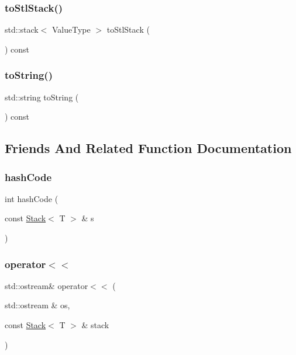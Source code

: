 \subsubsection{\texorpdfstring{to\+Stl\+Stack()}{toStlStack()}}
{\footnotesize\ttfamily std\+::stack$<$ Value\+Type $>$ to\+Stl\+Stack (\begin{DoxyParamCaption}{ }\end{DoxyParamCaption}) const}

\mbox{\label{classStack_a1fe5121d6528fdea3f243321b3fa3a49}} 
\subsubsection{\texorpdfstring{to\+String()}{toString()}}
{\footnotesize\ttfamily std\+::string to\+String (\begin{DoxyParamCaption}{ }\end{DoxyParamCaption}) const}



\subsection{Friends And Related Function Documentation}
\mbox{\label{classStack_add24e0ce849c0b2045c24ee3fba490ea}} 
\subsubsection{\texorpdfstring{hash\+Code}{hashCode}}
{\footnotesize\ttfamily int hash\+Code (\begin{DoxyParamCaption}\item[{const \mbox{\hyperlink{classStack}{Stack}}$<$ T $>$ \&}]{s }\end{DoxyParamCaption})\hspace{0.3cm}{\ttfamily [friend]}}

\mbox{\label{classStack_a047eaf65350ba824d7aa36c925289d9c}} 
\subsubsection{\texorpdfstring{operator$<$$<$}{operator<<}}
{\footnotesize\ttfamily std\+::ostream\& operator$<$$<$ (\begin{DoxyParamCaption}\item[{std\+::ostream \&}]{os,  }\item[{const \mbox{\hyperlink{classStack}{Stack}}$<$ T $>$ \&}]{stack }\end{DoxyParamCaption})\hspace{0.3cm}{\ttfamily [friend]}}

